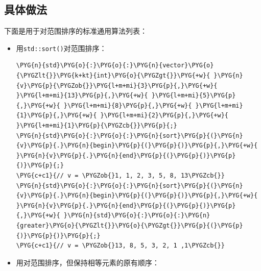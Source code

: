 
\subsection{具体做法}



下面是用于对范围排序的标准通用算法列表：



\begin{itemize}
\item 用\texttt{std::\allowbreak{}sort()}对范围排序：



\begin{codeblockbg}
\begin{Verbatim}[commandchars=\\\{\},breaklines=true,breakanywhere=true,fontsize=\codefont,xleftmargin=17bp]
\PYG{n}{std}\PYG{o}{:}\PYG{o}{:}\PYG{n}{vector}\PYG{o}{\PYGZlt{}}\PYG{k+kt}{int}\PYG{o}{\PYGZgt{}}\PYG{+w}{ }\PYG{n}{v}\PYG{p}{\PYGZob{}}\PYG{l+m+mi}{3}\PYG{p}{,}\PYG{+w}{ }\PYG{l+m+mi}{13}\PYG{p}{,}\PYG{+w}{ }\PYG{l+m+mi}{5}\PYG{p}{,}\PYG{+w}{ }\PYG{l+m+mi}{8}\PYG{p}{,}\PYG{+w}{ }\PYG{l+m+mi}{1}\PYG{p}{,}\PYG{+w}{ }\PYG{l+m+mi}{2}\PYG{p}{,}\PYG{+w}{ }\PYG{l+m+mi}{1}\PYG{p}{\PYGZcb{}}\PYG{p}{;}
\PYG{n}{std}\PYG{o}{:}\PYG{o}{:}\PYG{n}{sort}\PYG{p}{(}\PYG{n}{v}\PYG{p}{.}\PYG{n}{begin}\PYG{p}{(}\PYG{p}{)}\PYG{p}{,}\PYG{+w}{ }\PYG{n}{v}\PYG{p}{.}\PYG{n}{end}\PYG{p}{(}\PYG{p}{)}\PYG{p}{)}\PYG{p}{;}
\PYG{c+c1}{// v = \PYGZob{}1, 1, 2, 3, 5, 8, 13\PYGZcb{}}
\PYG{n}{std}\PYG{o}{:}\PYG{o}{:}\PYG{n}{sort}\PYG{p}{(}\PYG{n}{v}\PYG{p}{.}\PYG{n}{begin}\PYG{p}{(}\PYG{p}{)}\PYG{p}{,}\PYG{+w}{ }\PYG{n}{v}\PYG{p}{.}\PYG{n}{end}\PYG{p}{(}\PYG{p}{)}\PYG{p}{,}\PYG{+w}{ }\PYG{n}{std}\PYG{o}{:}\PYG{o}{:}\PYG{n}{greater}\PYG{o}{\PYGZlt{}}\PYG{o}{\PYGZgt{}}\PYG{p}{(}\PYG{p}{)}\PYG{p}{)}\PYG{p}{;}
\PYG{c+c1}{// v = \PYGZob{}13, 8, 5, 3, 2, 1 ,1\PYGZcb{}}
\end{Verbatim}
\end{codeblockbg}



\item 用对范围排序，但保持相等元素的原有顺序：




\end{itemize}
